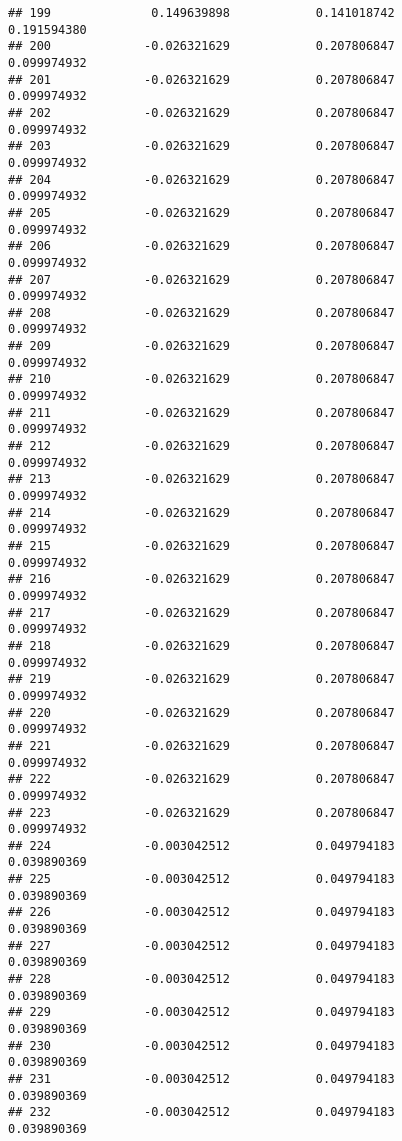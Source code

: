 \documentclass[]{article}
\begin{document}
\begin{verbatim}
## 199              0.149639898            0.141018742            0.191594380
## 200             -0.026321629            0.207806847            0.099974932
## 201             -0.026321629            0.207806847            0.099974932
## 202             -0.026321629            0.207806847            0.099974932
## 203             -0.026321629            0.207806847            0.099974932
## 204             -0.026321629            0.207806847            0.099974932
## 205             -0.026321629            0.207806847            0.099974932
## 206             -0.026321629            0.207806847            0.099974932
## 207             -0.026321629            0.207806847            0.099974932
## 208             -0.026321629            0.207806847            0.099974932
## 209             -0.026321629            0.207806847            0.099974932
## 210             -0.026321629            0.207806847            0.099974932
## 211             -0.026321629            0.207806847            0.099974932
## 212             -0.026321629            0.207806847            0.099974932
## 213             -0.026321629            0.207806847            0.099974932
## 214             -0.026321629            0.207806847            0.099974932
## 215             -0.026321629            0.207806847            0.099974932
## 216             -0.026321629            0.207806847            0.099974932
## 217             -0.026321629            0.207806847            0.099974932
## 218             -0.026321629            0.207806847            0.099974932
## 219             -0.026321629            0.207806847            0.099974932
## 220             -0.026321629            0.207806847            0.099974932
## 221             -0.026321629            0.207806847            0.099974932
## 222             -0.026321629            0.207806847            0.099974932
## 223             -0.026321629            0.207806847            0.099974932
## 224             -0.003042512            0.049794183            0.039890369
## 225             -0.003042512            0.049794183            0.039890369
## 226             -0.003042512            0.049794183            0.039890369
## 227             -0.003042512            0.049794183            0.039890369
## 228             -0.003042512            0.049794183            0.039890369
## 229             -0.003042512            0.049794183            0.039890369
## 230             -0.003042512            0.049794183            0.039890369
## 231             -0.003042512            0.049794183            0.039890369
## 232             -0.003042512            0.049794183            0.039890369

\end{verbatim}
\end{document}
